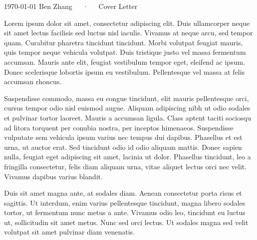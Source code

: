 \documentclass[11pt, letterpaper]{awesome-cv}
\begin{document}
\makecvheader[R]

\makecvfooter
  {\today}
  {Ben Zhang~~~·~~~Cover Letter}
  {}

\makelettertitle

\begin{cvletter}


Lorem ipsum dolor sit amet, consectetur adipiscing elit. Duis ullamcorper neque
sit amet lectus facilisis sed luctus nisl iaculis. Vivamus at neque arcu, sed
tempor quam. Curabitur pharetra tincidunt tincidunt. Morbi volutpat feugiat
mauris, quis tempor neque vehicula volutpat. Duis tristique justo vel massa
fermentum accumsan. Mauris ante elit, feugiat vestibulum tempor eget, eleifend
ac ipsum. Donec scelerisque lobortis ipsum eu vestibulum. Pellentesque vel massa
at felis accumsan rhoncus.


Suspendisse commodo, massa eu congue tincidunt, elit mauris pellentesque orci,
cursus tempor odio nisl euismod augue. Aliquam adipiscing nibh ut odio sodales
et pulvinar tortor laoreet. Mauris a accumsan ligula. Class aptent taciti
sociosqu ad litora torquent per conubia nostra, per inceptos
himenaeos. Suspendisse vulputate sem vehicula ipsum varius nec tempus dui
dapibus. Phasellus et est urna, ut auctor erat. Sed tincidunt odio id odio
aliquam mattis. Donec sapien nulla, feugiat eget adipiscing sit amet, lacinia ut
dolor. Phasellus tincidunt, leo a fringilla consectetur, felis diam aliquam
urna, vitae aliquet lectus orci nec velit. Vivamus dapibus varius blandit.


Duis sit amet magna ante, at sodales diam. Aenean consectetur porta risus et
sagittis. Ut interdum, enim varius pellentesque tincidunt, magna libero sodales
tortor, ut fermentum nunc metus a ante. Vivamus odio leo, tincidunt eu luctus
ut, sollicitudin sit amet metus. Nunc sed orci lectus. Ut sodales magna sed
velit volutpat sit amet pulvinar diam venenatis.

\end{cvletter}

\makeletterclosing
\end{document}
